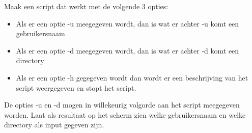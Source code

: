 Maak een script dat werkt met de volgende 3 opties:
\begin{itemize}
	\item Als er een optie -u meegegeven wordt, dan is wat er achter -u komt een gebruikersnaam
	\item Als er een optie -d meegegeven wordt, dan is wat er achter -d komt een directory
	\item Als er een optie -h gegegeven wordt dan wordt er een beschrijving van het script weergegeven en stopt het script.
\end{itemize}
De opties -u en -d mogen in willekeurig volgorde aan het script meegegeven worden. Laat als resultaat op het scherm zien welke gebruikersnaam en welke directory als input gegeven zijn.
